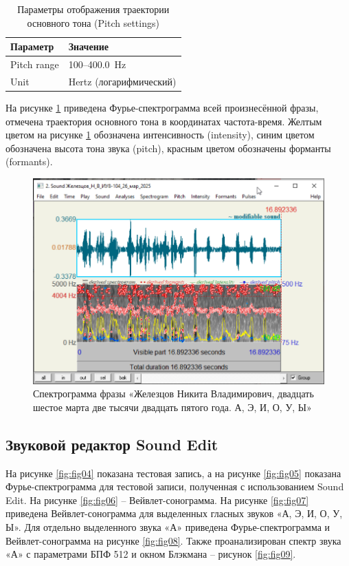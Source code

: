 \begin{table}[H]
\centering
\label{tab:tab03}
\caption{Параметры отображения траектории основного тона (Pitch settings)}
\begin{tabular}{|l|l|}
\hline
Параметр     & Значение              \\
\hline
Pitch range  & 100--400.0~Hz         \\
Unit         & Hertz (логарифмический) \\
\hline
\end{tabular}
\end{table}

На рисунке \ref{fig:fig03} приведена Фурье-спектрограмма всей произнесённой
фразы, отмечена траектория основного тона в координатах
частота-время. Желтым цветом на рисунке \ref{fig:fig03} обозначена
интенсивность (intensity), синим цветом обозначена высота тона звука (pitch),
красным цветом обозначены форманты (formants).

\begin{figure}
    \centering
    \includegraphics[scale=0.4]{inc/fig_03.png}
    \caption{
        Спектрограмма фразы «Железцов Никита Владимирович, двадцать шестое
        марта две тысячи двадцать пятого года. А, Э, И, О, У, Ы»
    }
    \label{fig:fig03}
\end{figure}

\subsection*{Звуковой редактор Sound Edit}

На рисунке \ref{fig:fig04} показана тестовая запись, а на рисунке
\ref{fig:fig05} показана Фурье-спектрограмма для тестовой записи, полученная с
использованием Sound Edit. На рисунке \ref{fig:fig06} – Вейвлет-сонограмма. На
рисунке \ref{fig:fig07} приведена Вейвлет-сонограмма для выделенных гласных
звуков «А, Э, И, О, У, Ы». Для отдельно выделенного звука «А» приведена
Фурье-спектрограмма и Вейвлет-сонограмма на рисунке \ref{fig:fig08}. Также
проанализирован спектр звука «А» с параметрами БПФ 512 и окном Блэкмана –
рисунок \ref{fig:fig09}.

